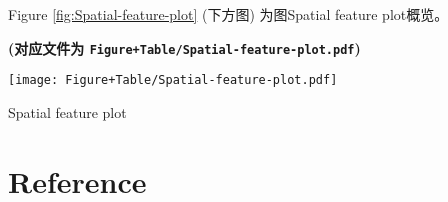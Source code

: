 \documentclass[
]{article}
\begin{document}
\begin{center}\vspace{1.5cm}\end{center}

\begin{center}\vspace{1.5cm}\end{center}

Figure \ref{fig:Spatial-feature-plot} (下方图) 为图Spatial feature plot概览。

\textbf{(对应文件为 \texttt{Figure+Table/Spatial-feature-plot.pdf})}

\def\@captype{figure}
\begin{center}
\texttt{[image: Figure+Table/Spatial-feature-plot.pdf]}
\caption{Spatial feature plot}\label{fig:Spatial-feature-plot}
\end{center}

\begin{center}\vspace{1.5cm}\end{center}

\hypertarget{bibliography}{%
\section*{Reference}\label{bibliography}}
\end{document}
